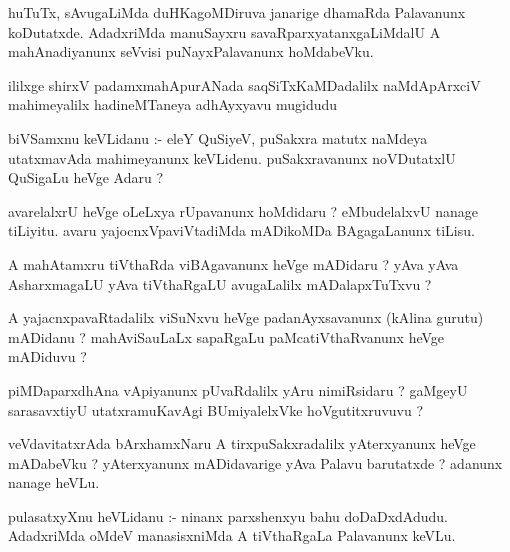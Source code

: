 \documentclass{article}
\begin{document}
\begin{mn}
huTuTx,  sAvugaLiMda  duHKagoMDiruva  janarige  dhamaRda  Palavanunx  koDutatxde.  AdadxriMda  
manuSayxru  savaRparxyatanxgaLiMdalU  A  mahAnadiyanunx  seVvisi  puNayxPalavanunx  hoMdabeVku.
\end{mn}

\begin{mn}
ililxge  shirxV padamxmahApurANada  saqSiTxKaMDadalilx  naMdApArxciV  mahimeyalilx  hadineMTaneya  adhAyxyavu  mugidudu
\end{mn}




\begin{mn}
biVSamxnu  keVLidanu :- eleY  QuSiyeV,  puSakxra  matutx  naMdeya utatxmavAda  
mahimeyanunx  keVLidenu.  puSakxravanunx  noVDutatxlU  QuSigaLu  heVge  Adaru ? 
\end{mn}

\begin{mn}
avarelalxrU  heVge oLeLxya  rUpavanunx  hoMdidaru ?  eMbudelalxvU  nanage  tiLiyitu.  
avaru  yajocnxVpaviVtadiMda  mADikoMDa  BAgagaLanunx  tiLisu.
\end{mn}

\begin{mn}
A  mahAtamxru  tiVthaRda  viBAgavanunx  heVge  mADidaru ?  yAva yAva  AsharxmagaLU  
yAva  tiVthaRgaLU  avugaLalilx  mADalapxTuTxvu ?
\end{mn}

\begin{mn}
A  yajacnxpavaRtadalilx  viSuNxvu  heVge  padanAyxsavanunx (kAlina gurutu) mADidanu ?  
mahAviSauLaLx  sapaRgaLu  paMcatiVthaRvanunx  heVge  mADiduvu ?
\end{mn}

\begin{mn}
piMDaparxdhAna  vApiyanunx  pUvaRdalilx  yAru  nimiRsidaru ?  gaMgeyU  sarasavxtiyU  
utatxramuKavAgi  BUmiyalelxVke  hoVgutitxruvuvu ?
\end{mn}

\begin{mn}
veVdavitatxrAda  bArxhamxNaru  A  tirxpuSakxradalilx  yAterxyanunx  heVge  mADabeVku ? 
yAterxyanunx  mADidavarige  yAva  Palavu barutatxde ?  adanunx  nanage heVLu.
\end{mn}

\begin{mn}
pulasatxyXnu  heVLidanu :- ninanx  parxshenxyu  bahu  doDaDxdAdudu.  AdadxriMda  oMdeV  
manasisxniMda  A  tiVthaRgaLa  Palavanunx  keVLu. 
\end{mn}
\end{document}
